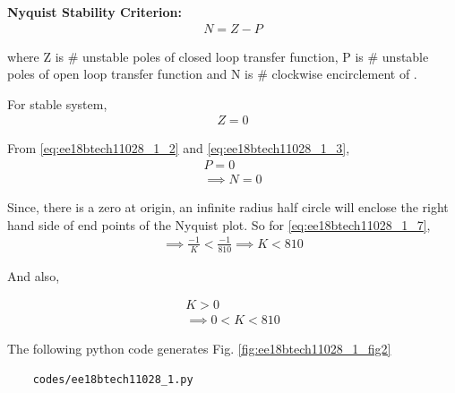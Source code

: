 \textbf{Nyquist Stability Criterion:}
\begin{align}
    N = Z - P
\end{align}

where Z is \# unstable poles of closed loop transfer function, P is \# unstable poles of open loop transfer function
and N is \# clockwise encirclement of .

For stable system, 
\begin{align}
    Z = 0
\end{align}

From \eqref{eq:ee18btech11028_1_2} and \eqref{eq:ee18btech11028_1_3},
\begin{align}
    P = 0
\\
    \implies N = 0
    \label{eq:ee18btech11028_1_7}
\end{align}




Since, there is a zero at origin, an infinite radius half circle will enclose the right hand side of end points of the Nyquist plot.
So for \eqref{eq:ee18btech11028_1_7},
\begin{align}
    \implies \frac{-1}{K} < \frac{-1}{810}
    \implies K < 810
\end{align}

And also,

\begin{align}
    K > 0
\\
    \implies 0 < K < 810     
\end{align}


The following python code generates  Fig. \ref{fig:ee18btech11028_1_fig2}
\begin{lstlisting}
    codes/ee18btech11028_1.py
\end{lstlisting}
